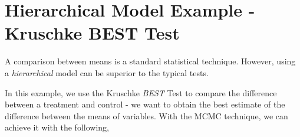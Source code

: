 \section{Hierarchical Model Example - Kruschke BEST Test}

A comparison between means is a standard statistical technique.  However, using a {\em hierarchical} model can be superior to the typical tests.\cite{kruschke2013bayesian}

In this example, we use the Kruschke \emph{BEST} Test to compare the difference between a treatment and control - we want to obtain the best estimate of the difference between the means of variables.  With the MCMC technique, we can achieve it with the following,

\begin{Shaded}
\begin{Highlighting}[]
  \NormalTok{*}
\end{Highlighting}
\end{Shaded}

